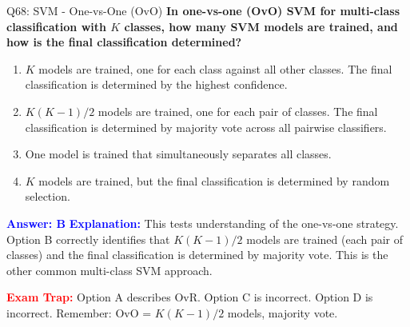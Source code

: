 \documentclass[8pt]{beamer}
\begin{document}
	\begin{frame}{Q68: SVM - One-vs-One (OvO)}
		\fontsize{6.5}{7.5}\selectfont
		\textbf{In one-vs-one (OvO) SVM for multi-class classification with $K$ classes, how many SVM models are trained, and how is the final classification determined?}
		
		\begin{enumerate}
			\item $K$ models are trained, one for each class against all other classes. The final classification is determined by the highest confidence.
			\item $K(K-1)/2$ models are trained, one for each pair of classes. The final classification is determined by majority vote across all pairwise classifiers.
			\item One model is trained that simultaneously separates all classes.
			\item $K$ models are trained, but the final classification is determined by random selection.
		\end{enumerate}
		
		\vspace{0.1cm}
		\textcolor{blue}{\textbf{Answer: B}}
		\vspace{0.1cm}
		\textcolor{blue}{\textbf{Explanation:}} This tests understanding of the one-vs-one strategy. Option B correctly identifies that $K(K-1)/2$ models are trained (each pair of classes) and the final classification is determined by majority vote. This is the other common multi-class SVM approach.
		
		\textcolor{red}{\textbf{Exam Trap:}} Option A describes OvR. Option C is incorrect. Option D is incorrect. Remember: OvO = $K(K-1)/2$ models, majority vote.
	\end{frame}
	
\end{document}
